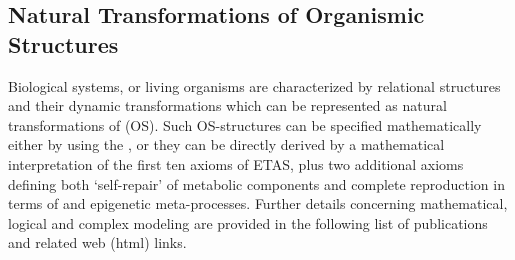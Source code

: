 \documentclass[12pt]{article}
\theoremstyle{plain}
\theoremstyle{definition}
\numberwithin{equation}{section}
\begin{document}
\subsection{Natural Transformations of Organismic Structures} 

Biological systems, or living organisms are characterized by relational structures and their dynamic transformations which can be represented  as natural transformations of (OS). Such OS-structures can be specified mathematically either by using the , or they can be directly derived by a mathematical interpretation of the first ten axioms of ETAS, plus two additional axioms defining both `self-repair' of metabolic components and complete reproduction in terms of  and epigenetic meta-processes. Further details concerning mathematical, logical and complex modeling are provided in the following list of publications and related web (html) links.
\end{document}
